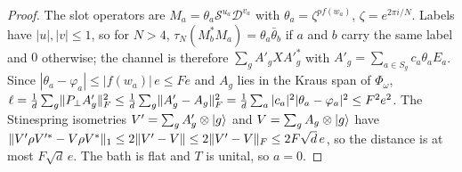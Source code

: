 \begin{proof}
The slot operators are $M_a=\theta_a\mathcal S^{u_a}\mathcal D^{v_a}$ with $\theta_a=\zeta^{pf(w_a)}$, $\zeta=e^{2\pi i/N}$. Labels have $|u|,|v|\le1$, so for $N>4$,
$\tau_N(M_b^*M_a)=\theta_a\bar\theta_b$ if $a$ and $b$ carry the same label and $0$ otherwise; the channel is therefore $\sum_gA'_gXA'^*_g$ with
$A'_g=\sum_{a\in S_g}c_a\theta_aE_a$. Since $|\theta_a-\varphi_a|\le|f(w_a)|\,e\le Fe$ and $A_g$ lies in the Kraus span of $\Phi_\omega$,
$\ell=\frac1d\sum_g\lVert P_\perp A'_g\rVert_F^2\le\frac1d\sum_g\lVert A'_g-A_g\rVert_F^2=\frac1d\sum_a|c_a|^2|\theta_a-\varphi_a|^2\le F^2e^2$. The Stinespring isometries
$V'=\sum_gA'_g\otimes\lvert g\rangle$ and $V=\sum_gA_g\otimes\lvert g\rangle$ have $\lVert V'\rho V'^*-V\rho V^*\rVert_1\le2\lVert V'-V\rVert\le2\lVert V'-V\rVert_F\le2F\sqrt d\,e$, so the distance is at most
$F\sqrt d\,e$. The bath is flat and $T$ is unital, so $a=0$.
\end{proof}

